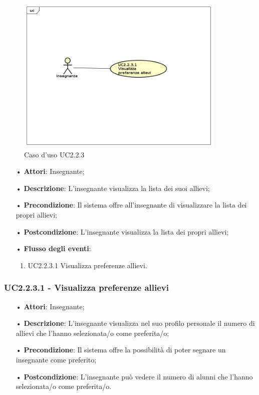 \begin{figure}[H]
\centering
\includegraphics[width=10cm]{img/UC223.png} 
\caption{Caso d'uso UC2.2.3}
\end{figure}

\begin{itemize}
	\item[•] \textbf{Attori}: Insegnante;
	\item[•] \textbf{Descrizione}: L’insegnante visualizza la lista dei suoi allievi;
	\item[•] \textbf{Precondizione}: Il sistema offre all’insegnante di visualizzare la lista dei propri allievi;
	\item[•] \textbf{Postcondizione}: L’insegnante visualizza la lista dei propri allievi;
	\item[•] \textbf{Flusso degli eventi}:
		\begin{enumerate}
			\item UC2.2.3.1 Visualizza preferenze allievi.
		\end{enumerate}
\end{itemize}

\subsubsection{UC2.2.3.1 - Visualizza preferenze allievi}
\begin{itemize}
	\item[•] \textbf{Attori}: Insegnante;
	\item[•] \textbf{Descrizione}: L’insegnante visualizza nel suo profilo personale il numero di allievi che l'hanno selezionata/o come preferita/o;
	\item[•] \textbf{Precondizione}: Il sistema offre la possibilità di poter segnare un insegnante come preferito;
	\item[•] \textbf{Postcondizione}: L’insegnante può vedere il numero di alunni che l'hanno selezionata/o come preferita/o.
\end{itemize}


